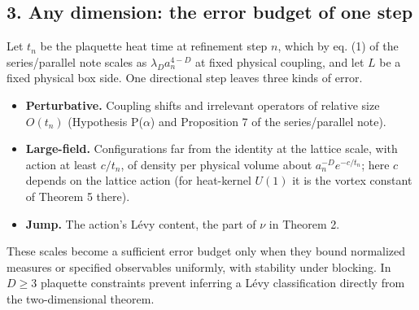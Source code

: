 \documentclass[11pt,a4paper]{article}
\newcommand{\tightlist}{\setlength{\itemsep}{0pt}\setlength{\parskip}{0pt}}
\begin{document}
\hypertarget{any-dimension-the-error-budget-of-one-step}{%
\subsection{3. Any dimension: the error budget of one
step}\label{any-dimension-the-error-budget-of-one-step}}

Let \(t_n\) be the plaquette heat time at refinement step \(n\), which
by eq. (1) of the series/parallel note scales as \(\lambda_Da_n^{4-D}\)
at fixed physical coupling, and let \(L\) be a fixed physical box side.
One directional step leaves three kinds of error.

\begin{itemize}
\tightlist
\item
  \textbf{Perturbative.} Coupling shifts and irrelevant operators of
  relative size \(O(t_n)\) (Hypothesis P(\(\alpha\)) and Proposition 7
  of the series/parallel note).
\item
  \textbf{Large-field.} Configurations far from the identity at the
  lattice scale, with action at least \(c/t_n\), of density per physical
  volume about \(a_n^{-D}e^{-c/t_n}\); here \(c\) depends on the lattice
  action (for heat-kernel \(U(1)\) it is the vortex constant of Theorem
  5 there).
\item
  \textbf{Jump.} The action's Lévy content, the part of \(\nu\) in
  Theorem 2.
\end{itemize}

These scales become a sufficient error budget only when they bound
normalized measures or specified observables uniformly, with stability
under blocking. In \(D\ge3\) plaquette constraints prevent inferring a
Lévy classification directly from the two-dimensional theorem.
\end{document}
